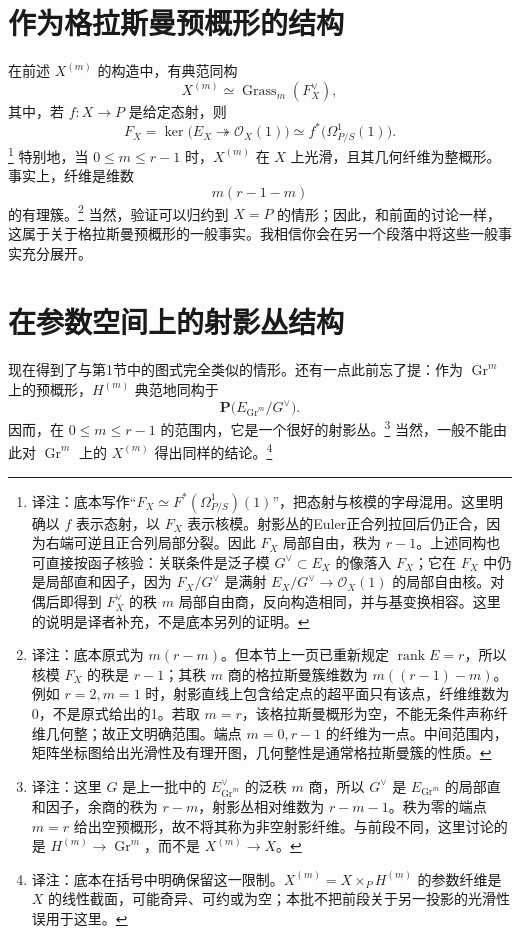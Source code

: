\documentclass[openany,fontset=fandol]{ctexbook}
\newcommand{\note}[1]{\footnote{译注：#1}}
\begin{document}
\section*{作为格拉斯曼预概形的结构}
在前述 $X^{(m)}$ 的构造中，有典范同构
\[
X^{(m)}\simeq\operatorname{Grass}_{m}(F_X^\vee),
\]
其中，若 $f:X\to P$ 是给定态射，则
\[
F_X=\ker\bigl(E_X\twoheadrightarrow\mathcal O_X(1)\bigr)
\simeq f^*\bigl(\Omega^1_{P/S}(1)\bigr).
\]
\note{底本写作“$F_X\simeq F^*(\Omega^1_{P/S})(1)$”，把态射与核模的字母混用。这里明确以 $f$ 表示态射，以 $F_X$ 表示核模。射影丛的Euler正合列拉回后仍正合，因为右端可逆且正合列局部分裂。因此 $F_X$ 局部自由，秩为 $r-1$。上述同构也可直接按函子核验：关联条件是泛子模 $G^\vee\subset E_X$ 的像落入 $F_X$；它在 $F_X$ 中仍是局部直和因子，因为 $F_X/G^\vee$ 是满射 $E_X/G^\vee\to\mathcal O_X(1)$ 的局部自由核。对偶后即得到 $F_X^\vee$ 的秩 $m$ 局部自由商，反向构造相同，并与基变换相容。这里的说明是译者补充，不是底本另列的证明。}
特别地，当 $0\leq m\leq r-1$ 时，$X^{(m)}$ 在 $X$ 上光滑，且其几何纤维为整概形。事实上，纤维是维数
\[
m(r-1-m)
\]
的有理簇。\note{底本原式为 $m(r-m)$。但本节上一页已重新规定 $\operatorname{rank}E=r$，所以核模 $F_X$ 的秩是 $r-1$；其秩 $m$ 商的格拉斯曼簇维数为 $m((r-1)-m)$。例如 $r=2,m=1$ 时，射影直线上包含给定点的超平面只有该点，纤维维数为0，不是原式给出的1。若取 $m=r$，该格拉斯曼概形为空，不能无条件声称纤维几何整；故正文明确范围。端点 $m=0,r-1$ 的纤维为一点。中间范围内，矩阵坐标图给出光滑性及有理开图，几何整性是通常格拉斯曼簇的性质。}
当然，验证可以归约到 $X=P$ 的情形；因此，和前面的讨论一样，这属于关于格拉斯曼预概形的一般事实。我相信你会在另一个段落中将这些一般事实充分展开。

\section*{在参数空间上的射影丛结构}
现在得到了与第1节中的图式完全类似的情形。还有一点此前忘了提：作为 $\operatorname{Gr}^{m}$ 上的预概形，$H^{(m)}$ 典范地同构于
\[
\mathbf P\bigl(E_{\operatorname{Gr}^{m}}/G^\vee\bigr).
\]
因而，在 $0\leq m\leq r-1$ 的范围内，它是一个很好的射影丛。\note{这里 $G$ 是上一批中的 $E^\vee_{\operatorname{Gr}^{m}}$ 的泛秩 $m$ 商，所以 $G^\vee$ 是 $E_{\operatorname{Gr}^{m}}$ 的局部直和因子，余商的秩为 $r-m$，射影丛相对维数为 $r-m-1$。秩为零的端点 $m=r$ 给出空预概形，故不将其称为非空射影纤维。与前段不同，这里讨论的是 $H^{(m)}\to\operatorname{Gr}^{m}$，而不是 $X^{(m)}\to X$。}
当然，一般不能由此对 $\operatorname{Gr}^{m}$ 上的 $X^{(m)}$ 得出同样的结论。\note{底本在括号中明确保留这一限制。$X^{(m)}=X\times_P H^{(m)}$ 的参数纤维是 $X$ 的线性截面，可能奇异、可约或为空；本批不把前段关于另一投影的光滑性误用于这里。}
\end{document}
